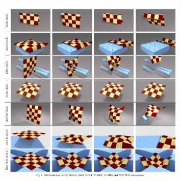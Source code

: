 \documentclass[serif,mathserif, 12pt]{beamer}
\begin{document}
\begin{frame}
  \begin{figure}
    \centering
    \includegraphics[width=0.8\textwidth]{img/gallery}
  \end{figure}
\end{frame}

\begin{frame} 
\end{frame}
\end{document}

